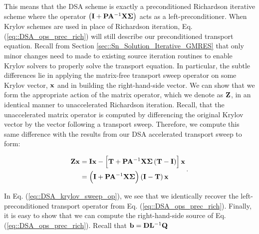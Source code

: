 \noindent This means that the DSA scheme is exactly a preconditioned Richardson iterative scheme where the operator $\left( {\bf I} + {\bf P} {\bf A}^{-1} {\bf X} {\bf \Sigma} \right)$ acts as a left-preconditioner. When Krylov schemes are used in place of Richardson iteration, Eq. (\ref{eq::DSA_ops_prec_rich}) will still describe our preconditioned transport equation. Recall from Section \ref{sec::Sn_Solution_Iterative_GMRES} that only minor changes need to made to existing source iteration routines to enable Krylov solvers to properly solve the transport equation. In particular, the subtle differences lie in applying the matrix-free transport sweep operator on some Krylov vector, ${\bf x}$ and in building the right-hand-side vector. We can show that we form the appropriate action of the matrix operator, which we denote as ${\bf Z}$, in an identical manner to unaccelerated Richardson iteration. Recall, that the unaccelerated matrix operator is computed by differencing the original Krylov vector by the vector following a transport sweep. Therefore, we compute this same difference with the results from our DSA accelerated transport sweep to form:

\begin{equation}
\label{eq::DSA_krylov_sweep_op}
\begin{aligned}
{\bf Z} {\bf x} &=  {\bf I} {\bf x} -  \left[ {\bf T}  + {\bf P} {\bf A}^{-1} {\bf X} {\bf \Sigma} \left(  {\bf T}    - {\bf I} \right) \right] {\bf x}\\
&=\left(  {\bf I} +  {\bf P} {\bf A}^{-1} {\bf X} {\bf \Sigma} \right)  \left(  {\bf I}    - {\bf T} \right)  {\bf x}
\end{aligned} \, .
\end{equation}

\noindent In Eq. (\ref{eq::DSA_krylov_sweep_op}), we see that we identically recover the left-preconditioned transport operator from Eq. (\ref{eq::DSA_ops_prec_rich}). Finally, it is easy to show that we can compute the right-hand-side source of Eq. (\ref{eq::DSA_ops_prec_rich}). Recall that ${\bf b} = {\bf D}{\bf L}^{-1}{\bf Q}$

